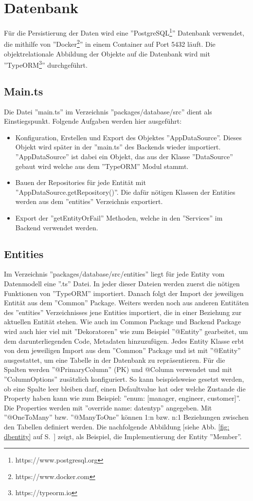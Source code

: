 \chapter{Datenbank}
Für die Persistierung der Daten wird eine ''PostgreSQL\footnote{https://www.postgresql.org}'' Datenbank verwendet, die mithilfe von ''Docker\footnote{https://www.docker.com}'' in einem Container auf Port 5432 läuft. Die objektrelationale Abbildung der Objekte auf die Datenbank wird mit ''TypeORM\footnote{https://typeorm.io}'' durchgeführt.


\section{Main.ts}
Die Datei ''main.ts'' im Verzeichnis ''packages/database/src'' dient als Einstiegspunkt. Folgende Aufgaben werden hier ausgeführt:
\begin{itemize}
    \item Konfiguration, Erstellen und Export des Objektes ''AppDataSource''. Dieses Objekt wird später in der ''main.ts'' des Backends wieder importiert. ''AppDataSource'' ist dabei ein Objekt, das aus der Klasse ''DataSource'' gebaut wird welche aus dem ''TypeORM'' Modul stammt.
    \item Bauen der Repositories für jede Entität mit ''AppDataSource.getRepository()''. Die dafür nötigen Klassen der Entities werden aus dem ''entities'' Verzeichnis exportiert.
    \item Export der ''getEntityOrFail'' Methoden, welche in den ''Services'' im Backend verwendet werden.
\end{itemize}


\section{Entities}
Im Verzeichnis ''packages/database/src/entities'' liegt für jede Entity vom Datenmodell eine ''.ts'' Datei. In jeder dieser Dateien werden zuerst die nötigen Funktionen von ''TypeORM'' importiert. Danach folgt der Import der jeweiligen Entität aus dem ''Common'' Package. Weiters werden noch aus anderen Entitäten des ''entities'' Verzeichnisses jene Entities importiert, die in einer Beziehung zur aktuellen Entität stehen. Wie auch im Common Package und Backend Package wird auch hier viel mit ''Dekoratoren'' wie zum Beispiel ''@Entity'' gearbeitet, um dem darunterliegenden Code, Metadaten hinzuzufügen. Jedes Entity Klasse erbt von dem jeweiligen Import aus dem ''Common'' Package und ist mit ''@Entity'' ausgestattet, um eine Tabelle in der Datenbank zu repräsentieren. Für die Spalten werden ''@PrimaryColumn'' (PK) und @Column verwendet und mit ''ColumnOptions'' zusätzlich konfiguriert. So kann beispielsweise gesetzt werden, ob eine Spalte leer bleiben darf, einen Defaultvalue hat oder welche Zustande die Property haben kann wie zum Beispiel: ''enum: [manager, engineer, customer]''. Die Properties werden mit ''override name: datentyp'' angegeben. Mit ''@OneToMany'' bzw. ''@ManyToOne'' können 1:n bzw. n:1 Beziehungen zwischen den Tabellen definiert werden. Die nachfolgende Abbildung [siehe Abb. \ref{fig: dbentity} auf S.~\pageref{fig: dbentity}] zeigt, als Beispiel, die Implementierung der Entity ''Member''.

